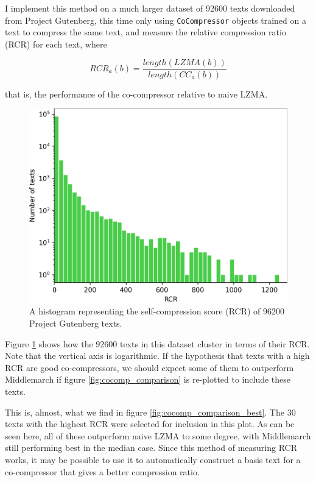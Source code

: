 I implement this method on a much larger dataset of 92600 texts downloaded from Project Gutenberg, this time only using \texttt{CoCompressor} objects trained on a text to compress the same text, and measure the relative compression ratio (RCR) for each text, where

$$RCR_a(b) = \frac{length(LZMA(b))}{length(CC_a(b))}$$

that is, the performance of the co-compressor relative to naive LZMA.

\begin{figure}[h]
\centering
\includegraphics[width=\textwidth]{img/fig_self-compression_histogram.png}
\caption{A histogram representing the self-compression score (RCR) of 96200 Project Gutenberg texts.}
\label{fig:self_compression_histogram}
\end{figure}

Figure \ref{fig:self_compression_histogram} shows how the 92600 texts in this dataset cluster in terms of their RCR. Note that the vertical axis is logarithmic. If the hypothesis that texts with a high RCR are good co-compressors, we should expect some of them to outperform Middlemarch if figure \ref{fig:cocomp_comparison} is re-plotted to include these texts.

This is, almost, what we find in figure \ref{fig:cocomp_comparison_best}. The 30 texts with the highest RCR were selected for inclusion in this plot. As can be seen here, all of these outperform naive LZMA to some degree, with Middlemarch still performing best in the median case. Since this method of measuring RCR works, it may be possible to use it to automatically construct a basis text for a co-compressor that gives a better compression ratio.


